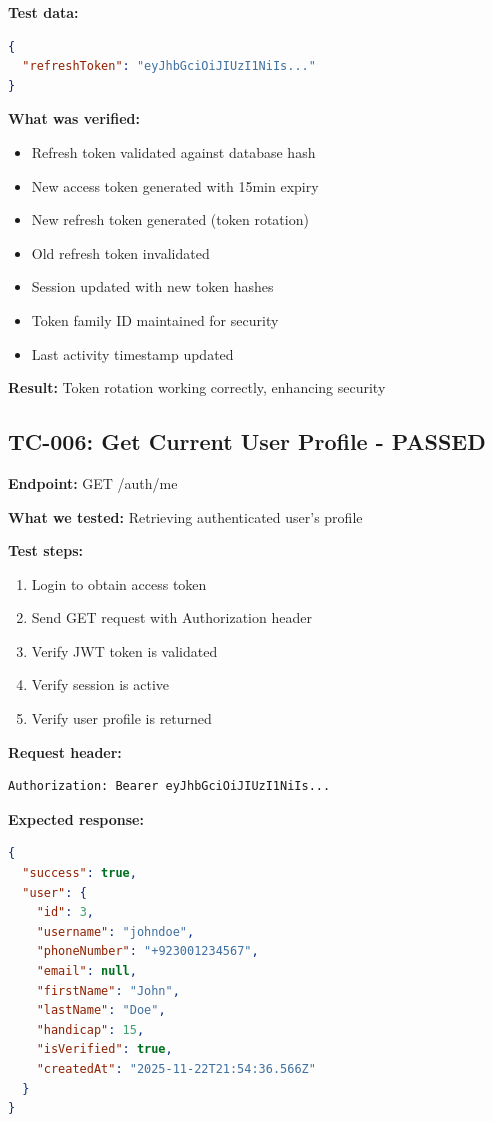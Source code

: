 \documentclass[11pt,a4paper]{article}
\begin{document}
\textbf{Test data:}
\begin{lstlisting}[language=json]
{
  "refreshToken": "eyJhbGciOiJIUzI1NiIs..."
}
\end{lstlisting}

\textbf{What was verified:}
\begin{itemize}
    \item Refresh token validated against database hash
    \item New access token generated with 15min expiry
    \item New refresh token generated (token rotation)
    \item Old refresh token invalidated
    \item Session updated with new token hashes
    \item Token family ID maintained for security
    \item Last activity timestamp updated
\end{itemize}

\textbf{Result:} Token rotation working correctly, enhancing security

\subsection{TC-006: Get Current User Profile - PASSED}
\textbf{Endpoint:} GET /auth/me

\textbf{What we tested:} Retrieving authenticated user's profile

\textbf{Test steps:}
\begin{enumerate}
    \item Login to obtain access token
    \item Send GET request with Authorization header
    \item Verify JWT token is validated
    \item Verify session is active
    \item Verify user profile is returned
\end{enumerate}

\textbf{Request header:}
\begin{lstlisting}
Authorization: Bearer eyJhbGciOiJIUzI1NiIs...
\end{lstlisting}

\textbf{Expected response:}
\begin{lstlisting}[language=json]
{
  "success": true,
  "user": {
    "id": 3,
    "username": "johndoe",
    "phoneNumber": "+923001234567",
    "email": null,
    "firstName": "John",
    "lastName": "Doe",
    "handicap": 15,
    "isVerified": true,
    "createdAt": "2025-11-22T21:54:36.566Z"
  }
}
\end{lstlisting}
\end{document}
